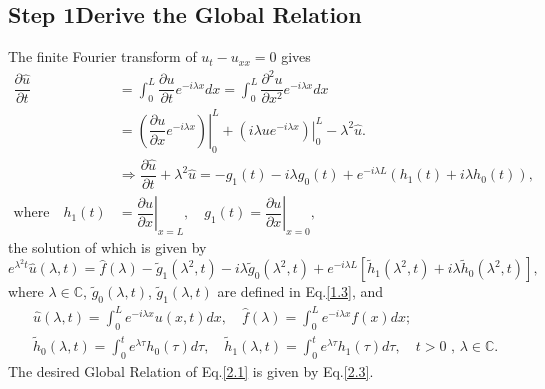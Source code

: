 \documentclass[12pt]{article}
\numberwithin{equation}{section}
\begin{document}
\subsection{Step 1\textemdash Derive the Global Relation}
The finite Fourier transform of $u_t-u_{xx}=0$ gives
\begin{equation}
    \begin{split}
        \dfrac{\partial\hat{u}}{\partial t}&=\int_{0}^{L} \dfrac{\partial u}{\partial t} e^{-i\lambda x}dx=\int_{0}^{L} \dfrac{\partial^2 u}{\partial x^2}e^{-i\lambda x}dx\\
        &=\left.\left(\dfrac{\partial u}{\partial x}e^{-i\lambda x}\right)\right\vert_{0}^{L}+\left.(i\lambda ue^{-i\lambda x})\right\vert_{0}^{L}-\lambda^2\hat{u}.\\
        &\Rightarrow \dfrac{\partial \hat{u}}{\partial t}+\lambda^2\hat{u}=-g_1(t)-i\lambda g_0(t)+e^{-i\lambda L}(h_1(t)+i\lambda h_0(t)),\\
        \text{where} \quad h_1(t)&=\left.\dfrac{\partial u}{\partial x}\right\vert_{x=L},\quad g_1(t)=\left.\dfrac{\partial u}{\partial x}\right\vert_{x=0},
    \end{split}
\end{equation}
the solution of which is given by 
\begin{equation}\label{2.3}
    e^{\lambda^2 t}\hat{u}(\lambda,t)=\hat{f}(\lambda)-\tilde{g}_1(\lambda^2,t)-i\lambda\tilde{g}_0(\lambda^2,t)+e^{-i\lambda L}[\tilde{h}_1(\lambda^2,t)+i\lambda\tilde{h}_0(\lambda^2,t)],
\end{equation}
where $\lambda\in\mathbb{C}$, $\tilde{g}_0(\lambda,t)$, $\tilde{g}_1(\lambda,t)$ are defined in Eq.\eqref{1.3}, and 
\begin{equation}
    \begin{split}
        &\hat{u}(\lambda,t)=\int_{0}^{L} e^{-i\lambda x}u(x,t)dx,\quad \hat{f}(\lambda)=\int_{0}^{L}e^{-i\lambda x}f(x)dx;\\
        &\tilde{h}_0(\lambda,t)=\int_{0}^{t}e^{\lambda\tau} h_0(\tau)d\tau,\quad \tilde{h}_1(\lambda,t)=\int_{0}^{t}e^{\lambda\tau} h_1(\tau)d\tau,\quad t>0\text{ , }\lambda\in\mathbb{C}.
    \end{split}
\end{equation}
The desired Global Relation of Eq.\eqref{2.1} is given by Eq.\eqref{2.3}.
\end{document}
